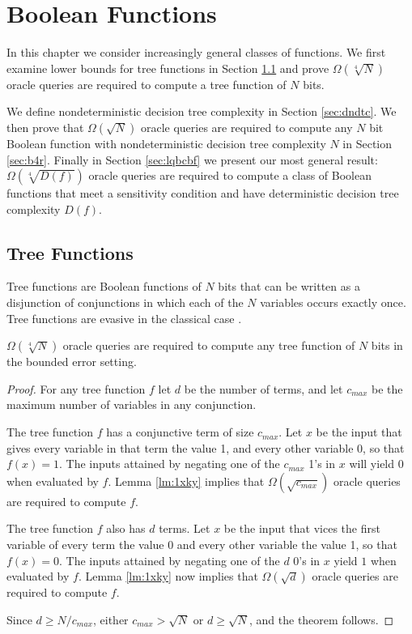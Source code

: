 \newtheorem{cond}{Condition}[section]
\newtheorem{algoi}{Algorithm}[section]

\chapter{Boolean Functions}
\label{ch:general}

In this chapter we consider increasingly general classes of functions.
We first examine lower bounds for tree functions in Section
\ref{sec:tree} and prove $\Omega(\sqrt[4]{N})$ oracle
queries are required to compute a tree function of $N$ bits.

We define nondeterministic decision tree complexity in Section
\ref{sec:dndtc}.  We then prove that $\Omega(\sqrt{N})$ oracle queries
are required to compute any $N$ bit Boolean function with
nondeterministic decision tree complexity $N$ in Section
\ref{sec:b4r}.  Finally in Section \ref{sec:lqbcbf} we present our
most general result: $\Omega(\sqrt[4]{D(f)})$ oracle queries are
required to compute a class of Boolean functions that meet a
sensitivity condition and have deterministic decision tree complexity
$D(f)$.

\section{Tree Functions}
\label{sec:tree}

Tree functions are Boolean functions of $N$ bits that can be written
as a disjunction of conjunctions in which each of the $N$ variables
occurs exactly once.  Tree functions are evasive in the classical case
\cite{lovasz94evasive}.

\begin{theorem}
\label{theo:treelow}
$\Omega(\sqrt[4]{N})$ oracle queries are required to compute any tree
function of $N$ bits in the bounded error setting.
\end{theorem}

\begin{proof}
For any tree function $f$ let $d$ be the number of terms, and let
$c_{max}$ be the maximum number of variables in any conjunction.

The tree function $f$ has a conjunctive term of size $c_{max}$.  Let
$x$ be the input that gives every variable in that term the value 1,
and every other variable 0, so that $f(x) = 1$.  The inputs attained
by negating one of the $c_{max}$ 1's in $x$ will yield $0$ when
evaluated by $f$.  Lemma \ref{lm:1xky} implies that
$\Omega(\sqrt{c_{max}})$ oracle queries are required to compute $f$.

The tree function $f$ also has $d$ terms.  Let $x$ be the input that
vices the first variable of every term the value 0 and every other
variable the value 1, so that $f(x) = 0$.  The inputs attained by
negating one of the $d$ 0's in $x$ yield $1$ when evaluated by $f$.
Lemma \ref{lm:1xky} now implies that $\Omega(\sqrt{d})$ oracle queries
are required to compute $f$.

Since $d \ge N/c_{max}$, either $c_{max} > \sqrt{N}$ or $d \ge
\sqrt{N}$, and the theorem follows.
\end{proof}

